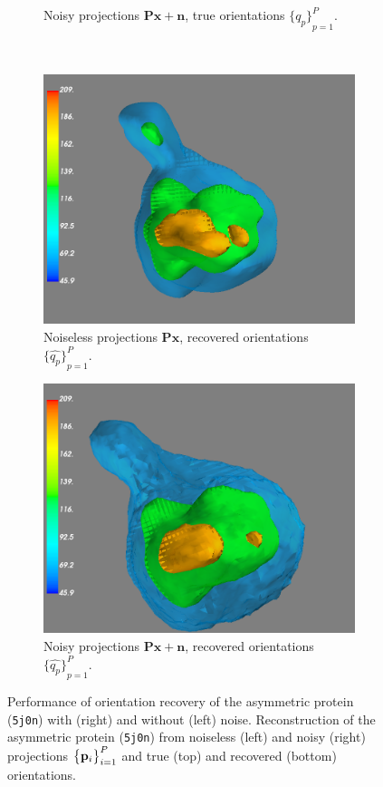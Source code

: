 \begin{figure}[ht!]
\begin{subfigure}[b]{0.49\linewidth}
        \caption{Noisy projections $\mathbf{Px + n}$, true orientations ${\big\{q_p\big\}}_{p=1}^P$.}
    \end{subfigure}
    \\
    \begin{subfigure}[b]{0.49\linewidth}
        \centering
        \includegraphics[width=0.90\linewidth]{figures/5j0n_reconstruction_noise0}
        \caption{Noiseless projections $\mathbf{Px}$, recovered orientations ${\big\{\widehat{q_p}\big\}}_{p=1}^P$.}
    \end{subfigure}
    \hfill
    \begin{subfigure}[b]{0.49\linewidth}
        \centering
        \includegraphics[width=0.90\linewidth]{figures/5j0n_reconstruction_noise16}
        \caption{Noisy projections $\mathbf{Px + n}$, recovered orientations ${\big\{\widehat{q_p}\big\}}_{p=1}^P$.}
    \end{subfigure}
    \caption{
        Performance of orientation recovery of the asymmetric protein (\texttt{5j0n}) with (right) and without (left) noise.
        Reconstruction of the asymmetric protein (\texttt{5j0n}) from noiseless (left) and noisy (right) projections ${\big\{\mathbf{p}_i\big\}}_{i=1}^P$ and true (top) and recovered (bottom) orientations.
    }\label{fig:5j0n-reconstruction-noise0}
    \label{fig:5j0n-reconstruction-noise16}
\end{figure}

